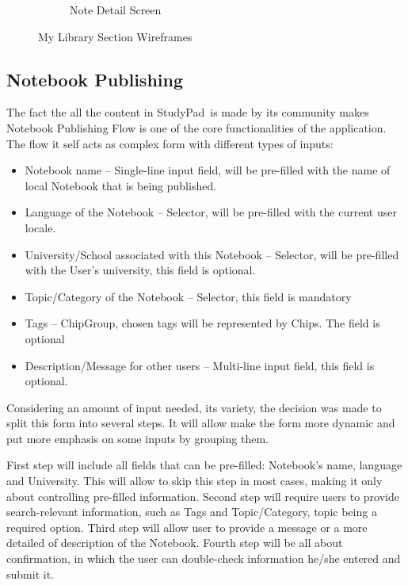 \documentclass[thesis=B,english]{FITthesis}[2012/10/20]
\newcommand{\appname}{StudyPad}
\begin{document}
\begin{figure}
\begin{subfigure}{.5\textwidth}
  \caption{Note Detail Screen}
  \label{fig:detail}
\end{subfigure}

\caption{My Library Section Wireframes}
\label{fig:section-library}
\end{figure}

\newpage
\subsection{Notebook Publishing}
The fact the all the content in \appname\ is made by its community makes Notebook Publishing Flow is one of the core functionalities of the application. The flow it self acts as complex form with different types of inputs:
\begin{itemize}
	\item Notebook name -- Single-line input field, will be pre-filled with the name of local Notebook that is being published.
	\item Language of the Notebook -- Selector, will be pre-filled with the current user locale.
	\item University/School associated with this Notebook -- Selector, will be pre-filled with the User's university, this field is optional.
	\item Topic/Category of the Notebook -- Selector, this field is mandatory
	\item Tags -- ChipGroup, chosen tags will be represented by Chips. The field is optional
	\item Description/Message for other users -- Multi-line input field, this field is optional.
\end{itemize}



Considering an amount of input needed, its variety, the decision was made to split this form into several steps. It will allow make the form more dynamic and put more emphasis on some inputs by grouping them.

First step will include all fields that can be pre-filled: Notebook's name, language and University. This will allow to skip this step in most cases, making it only about controlling pre-filled information.
Second step will require users to provide search-relevant information, such as Tags and Topic/Category, topic being a required option. Third step will allow user to provide a message or a more detailed of description of the Notebook. Fourth step will be all about confirmation, in which the user can double-check information he/she entered and submit it.
\end{document}
